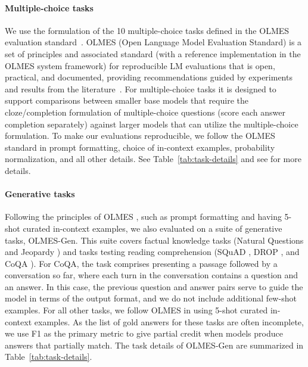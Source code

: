 \documentclass[table]{ai2style/ai2}
\begin{document}
\paragraph{Multiple-choice tasks} We use the formulation of the 10 multiple-choice tasks defined in the OLMES evaluation standard~\citep{olmes}. OLMES (Open Language Model Evaluation Standard) is a set of principles and associated standard (with a reference implementation in the OLMES system framework) for reproducible LM evaluations that is open, practical, and documented, providing recommendations guided by experiments and results from the literature~\citep{biderman2024lessons,eval-harness}. For multiple-choice tasks it is designed to support comparisons between smaller base models that require the cloze/completion formulation of multiple-choice questions (score each answer completion separately) against larger models that can utilize the multiple-choice formulation. To make our evaluations reproducible, we follow the OLMES standard in prompt formatting, choice of in-context examples, probability normalization, and all other details. See Table~\ref{tab:task-details} and see \citet{olmes} for more details. 

\paragraph{Generative tasks} Following the principles of OLMES \citep{olmes}, such as prompt formatting and having 5-shot curated in-context examples, we also evaluated on a suite of generative tasks, OLMES-Gen. This suite covers factual knowledge tasks (Natural Questions \citep{kwiatkowski-etal-2019-natural} and Jeopardy \citep{mosaic-jeopardy}) and tasks testing reading comprehension (SQuAD \citep{rajpurkar-etal-2016-squad}, DROP \citep{dua-etal-2019-drop}, and CoQA \citep{reddy-etal-2019-coqa}). For CoQA, the task comprises presenting a passage followed by a conversation so far, where each turn in the conversation contains a question and an answer. In this case, the previous question and answer pairs serve to guide the model in terms of the output format, and we do not include additional few-shot examples. For all other tasks, we follow OLMES in using 5-shot curated in-context examples. As the list of gold answers for these tasks are often incomplete, we use F1 as the primary metric to give partial credit when models produce answers that partially match.  The task details of OLMES-Gen are summarized in Table~\ref{tab:task-details}. 
\end{document}
